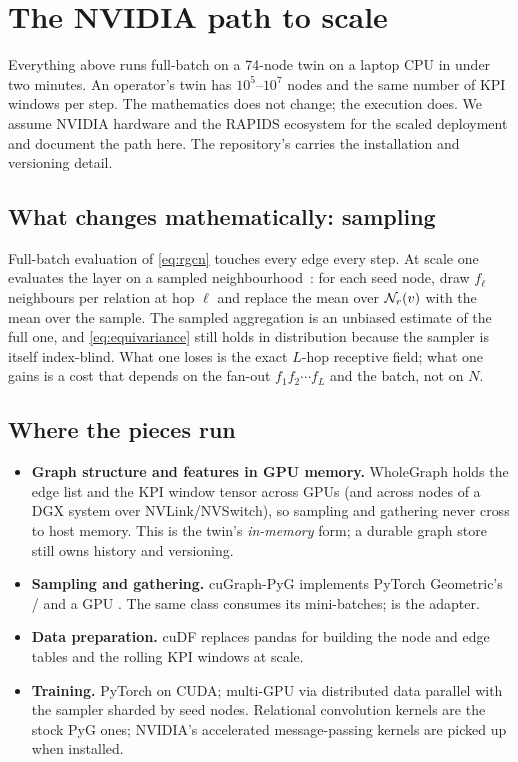 \chapter{The NVIDIA path to scale}
\label{ch:nvidia}

Everything above runs full-batch on a 74-node twin on a laptop CPU in under two minutes. An
operator's twin has $10^5$--$10^7$ nodes and the same number of KPI windows per step. The
mathematics does not change; the execution does. We assume NVIDIA hardware and the RAPIDS
ecosystem for the scaled deployment and document the path here. The repository's
 carries the installation and versioning detail.

\section{What changes mathematically: sampling}
Full-batch evaluation of \eqref{eq:rgcn} touches every edge every step. At scale one evaluates
the layer on a sampled neighbourhood~\cite{hamilton2017}: for each seed node, draw $f_\ell$
neighbours per relation at hop $\ell$ and replace the mean over $\mathcal{N}_r(v)$ with the mean over the
sample. The sampled aggregation is an unbiased estimate of the full one, and
\eqref{eq:equivariance} still holds in distribution because the sampler is itself index-blind.
What one loses is the exact $L$-hop receptive field; what one gains is a cost that depends on the
fan-out $f_1 f_2\cdots f_L$ and the batch, not on $N$.

\section{Where the pieces run}
\begin{itemize}[nosep]
  \item \textbf{Graph structure and features in GPU memory.} WholeGraph holds the edge list and
  the KPI window tensor across GPUs (and across nodes of a DGX system over NVLink/NVSwitch), so
  sampling and gathering never cross to host memory. This is the twin's \emph{in-memory} form; a
  durable graph store still owns history and versioning.
  \item \textbf{Sampling and gathering.} cuGraph-PyG implements PyTorch Geometric's
  / and a GPU . The same 
  class consumes its mini-batches;  is the adapter.
  \item \textbf{Data preparation.} cuDF replaces pandas for building the node and edge tables and
  the rolling KPI windows at scale.
  \item \textbf{Training.} PyTorch on CUDA; multi-GPU via distributed data parallel with the
  sampler sharded by seed nodes. Relational convolution kernels are the stock PyG ones; NVIDIA's
  accelerated message-passing kernels are picked up when installed.
\end{itemize}

